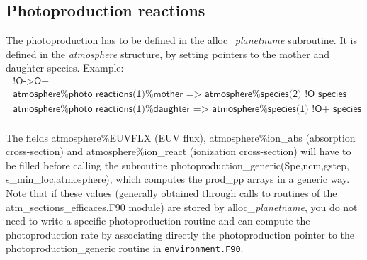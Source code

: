 \documentclass{article}
\begin{document}
\subsection{Photoproduction reactions}
The photoproduction has to be defined in the {\sf alloc\_}{\it planetname} subroutine. It is defined in the {\it atmosphere} structure, by setting pointers to the mother and daughter species. Example:
\[
\begin{array}{l}
  \textsf{  !O-$>$O+}\\
  \textsf{  atmosphere\%photo\_reactions(1)\%mother     =$>$ atmosphere\%species(2) !O species}\\
  \textsf{  atmosphere\%photo\_reactions(1)\%daughter   =$>$ atmosphere\%species(1) !O+ species}
\end{array}
\]\\
The fields atmosphere\%EUVFLX (EUV flux), atmosphere\%ion\_abs (absorption cross-section) and atmosphere\%ion\_react (ionization cross-section) will have to be filled before calling the subroutine {\sf photoproduction\_generic(Spe,ncm,gstep, s\_min\_loc,atmosphere)}, which computes the prod\_pp arrays in a generic way. Note that if these values (generally obtained through calls to routines of the {\sf atm\_sections\_efficaces.F90} module) are stored by {\sf alloc\_}{\it planetname}, you do not need to write a specific photoproduction routine and can compute the photoproduction rate by associating directly the photoproduction pointer to the {\sf photoproduction\_generic} routine in {\tt environment.F90}.\\
\end{document}

